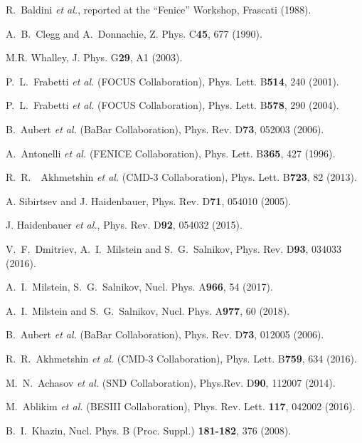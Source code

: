 \begin{thebibliography}{99}

R.\ Baldini {\em et al.}, reported at the ``Fenice''
Workshop, Frascati (1988).

A.~B.~Clegg and A.~Donnachie, Z. Phys. C{\bf 45}, 677 (1990).   

M.R. Whalley, J. Phys. G{\bf 29}, A1 (2003). 

 P.\ L.\ Frabetti {\em et al.}  (FOCUS Collaboration),  
Phys. Lett. B{\bf 514}, 240 (2001). 

P.\ L.\ Frabetti {\em et al.}  (FOCUS Collaboration), 
Phys. Lett. B{\bf 578}, 290 (2004).

 B.\ Aubert {\em et al.} (BaBar Collaboration),
Phys. Rev. D{\bf 73}, 052003 (2006).

 A.\ Antonelli  {\it et al.} (FENICE Collaboration),
Phys. Lett. B{\bf 365}, 427 (1996).

 R.\ R.\ ~Akhmetshin {\it et al.} (CMD-3 Collaboration), 
Phys. Lett. B{\bf 723}, 82 (2013).

 A. Sibirtsev and J. Haidenbauer, 
Phys. Rev. D{\bf 71}, 054010 (2005).

 J. Haidenbauer {\it et al.}, Phys. Rev. D{\bf 92},
054032 (2015). 

 V.\ F.\ Dmitriev, A.\ I.\ Milstein and S.\ G.\ Salnikov,
Phys. Rev. D{\bf 93}, 034033 (2016).

A.\ I.\ Milstein, S.\ G.\ Salnikov, 
Nucl. Phys. A{\bf 966}, 54 (2017).

A.\ I.\ Milstein and S.\ G.\ Salnikov, 
Nucl. Phys. A{\bf 977}, 60 (2018). 

 B.\ Aubert {\it et al.} (BaBar Collaboration), 
Phys. Rev. D{\bf 73}, 012005 (2006).

R.\ R.\ Akhmetshin {\it et al.} (CMD-3 Collaboration), 
Phys. Lett. B{\bf 759}, 634 (2016).

M.\ N.\ Achasov {\it et al.} (SND Collaboration),
Phys.Rev. D{\bf 90}, 112007 (2014).

 M.\ Ablikim {\it et al.} (BESIII Collaboration), 
Phys. Rev. Lett. {\bf 117}, 042002 (2016).

 B.\ I.\ Khazin, Nucl. Phys. B (Proc. Suppl.) {\bf 181-182},
 376 (2008).


\end{thebibliography}
